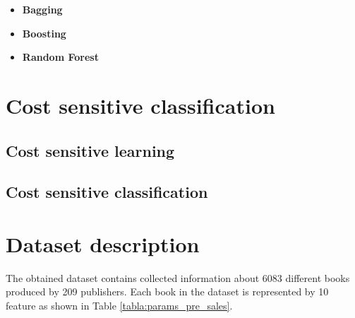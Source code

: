 \documentclass{llncs}
\begin{document}
\begin{itemize}
\item \textbf{Bagging}
\item \textbf{Boosting}
\item \textbf{Random Forest}
\end{itemize}



\section{Cost sensitive classification}

\subsection{Cost sensitive learning}
\subsection{Cost sensitive classification}


\section{Dataset description}







The obtained dataset contains collected information about 6083 different books produced by 209 publishers. Each book in the dataset is represented by 10 feature as shown in Table \ref{tabla:params_pre_sales}. 
\end{document}
